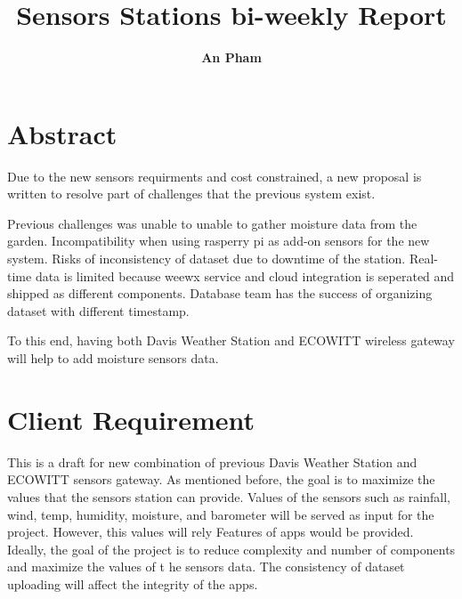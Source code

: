 \documentclass[10pt, a4paper]{article}
\begin{document}
\BgThispage
\pagestyle{fancy}
\title{\LARGE\bf{ Sensors Stations bi-weekly Report}}
\author{\large\bf{An Pham}}

\maketitle
\newpage
\section*{\centering Abstract}
\fancyhf{}
\fancyfoot[R]{\thepage}
\vspace{0 em}
\normalsize


\par Due to the new sensors requirments and cost constrained, a new proposal is written to resolve part of challenges that the previous system exist.

\par Previous challenges was unable to unable to gather moisture data from the garden. Incompatibility when using rasperry pi as add-on sensors for the new system. Risks of inconsistency of dataset due to downtime of the station. Real-time data is limited because weewx service and cloud integration is seperated and shipped as different components. Database team has the success of organizing dataset with different timestamp.

\par To this end, having both Davis Weather Station and ECOWITT wireless gateway will help to add moisture sensors data. 

\newpage


\section{Client Requirement} %
\par This is a draft for new combination of previous Davis Weather Station and ECOWITT sensors gateway. As mentioned before, the goal is to maximize the values that the sensors station can provide. Values of the sensors such as rainfall, wind, temp, humidity, moisture, and barometer will be served as input for the project. However, this values  will rely Features of apps would be provided. Ideally, the goal of the project is to reduce complexity and number of components and maximize the values of t he sensors data. The consistency of dataset uploading will affect the integrity of the apps.  
\end{document}
